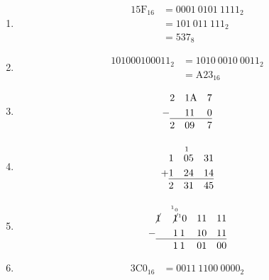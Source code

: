\documentclass[12pt,letterpaper,fleqn]{article}
\begin{document}
\begin{enumerate}

\item \begin{align*}
  15\text{F}_{16} &= 0001\ 0101\ 1111_2 \\
  &= 101\ 011\ 111_2 \\
  &= 537_8
\end{align*}
  
\item \begin{align*}
  101000100011_2 &= 1010\ 0010\ 0011_2 \\
  &= \text{A}23_{16}
\end{align*}

\item \begin{alignat*}{5}
  & 2 & 1 & \text{A} & 7 \\
  - & & 1 & 1 & 0 \\[-1.2em]
  \cline{2-5} \\[-2em]
  & 2 & 0 & 9 & 7
\end{alignat*}

\item \begin{alignat*}{6}
  & & \text{\scriptsize 1} & & & \\[-0.5em]
  & 1 & 0 & 5 & 3 & 1 \\
  + & 1 & 2 & 4 & 1 & 4 \\[-1.2em]
  \cline{2-6} \\[-2em]
  & 2 & 3 & 1 & 4 & 5
\end{alignat*}

\item \begin{alignat*}{8}
  & & \text{\tiny \textsuperscript{1}0} & & & & & \\[-0.5em]
  & \cancel{1} & \cancel{1} & ^{\text{\tiny 1}}0 & 1 & 1 & 1 & 1 \\
  - & & 1 & \hspace{2pt} 1 & 1 & 0 & 1 & 1 \\[-1.2em]
  \cline{2-8} \\[-2em]
  & & 1 & \hspace{2pt} 1 & 0 & 1 & 0 & 0
\end{alignat*}

\item \begin{align*}
  3\text{C}0_{16} &= 0011\ 1100\ 0000_2
\end{align*}


\end{enumerate}
\end{document}
